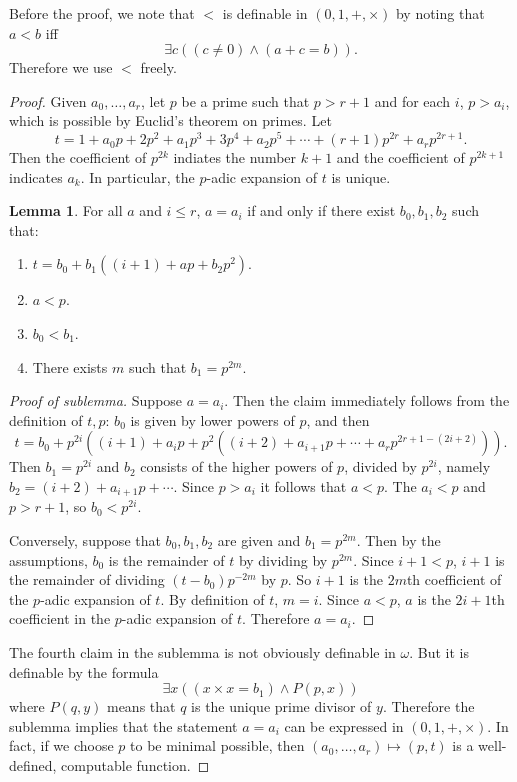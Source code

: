 \documentclass[12pt]{report}
\theoremstyle{definition}
\newtheorem{lemma}[theorem]{Lemma}
\begin{document}
Before the proof, we note that $<$ is definable in $(0, 1, +, \times)$ by noting that $a < b$ iff
$$\exists c((c \neq 0) \wedge (a + c = b)).$$
Therefore we use $<$ freely.
\begin{proof}
Given $a_0, \dots, a_r$, let $p$ be a prime such that $p > r + 1$ and for each $i$, $p > a_i$, which is possible by Euclid's theorem on primes. Let
$$t = 1 + a_0p + 2p^2 + a_1p^3 + 3p^4 + a_2p^5 + \cdots + (r+1)p^{2r} + a_r p^{2r+1}.$$
Then the coefficient of $p^{2k}$ indiates the number $k+1$ and the coefficient of $p^{2k+1}$ indicates $a_k$. In particular, the $p$-adic expansion of $t$ is unique.
\begin{lemma}
For all $a$ and $i \leq r$, $a = a_i$ if and only if there exist $b_0, b_1,b_2$ such that:
\begin{enumerate}
\item $t = b_0 + b_1((i+1) + ap + b_2p^2)$.
\item $a < p$.
\item $b_0 < b_1$.
\item There exists $m$ such that $b_1 = p^{2m}$.
\end{enumerate}
\end{lemma}
\begin{proof}[Proof of sublemma]
Suppose $a = a_i$. Then the claim immediately follows from the definition of $t, p$: $b_0$ is given by lower powers of $p$, and then
$$t = b_0 + p^{2i}((i+1) + a_ip + p^2((i+2) + a_{i+1}p + \cdots + a_rp^{2r+1 - (2i +2)} )).$$
Then $b_1 = p^{2i}$ and $b_2$ consists of the higher powers of $p$, divided by $p^{2i}$, namely $b_2 = (i+2) + a_{i+1}p + \cdots$. Since $p > a_i$ it follows that $a < p$. The $a_i < p$ and $p > r + 1$, so $b_0 < p^{2i}$.

Conversely, suppose that $b_0, b_1, b_2$ are given and $b_1 = p^{2m}$. Then by the assumptions, $b_0$ is the remainder of $t$ by dividing by $p^{2m}$. Since $i + 1 < p$, $i + 1$ is the remainder of dividing $(t - b_0)p^{-2m}$ by $p$. So $i + 1$ is the $2m$th coefficient of the $p$-adic expansion of $t$. By definition of $t$, $m = i$.
Since $a < p$, $a$ is the $2i+1$th coefficient in the $p$-adic expansion of $t$. Therefore $a = a_i$.
\end{proof}
The fourth claim in the sublemma is not obviously definable in $\omega$. But it is definable by the formula
$$\exists x((x \times x = b_1) \wedge P(p, x))$$
where $P(q, y)$ means that $q$ is the unique prime divisor of $y$. Therefore the sublemma implies that the statement $a = a_i$ can be expressed in $(0, 1, +, \times)$.
In fact, if we choose $p$ to be minimal possible, then $(a_0, \dots, a_r) \mapsto (p, t)$ is a well-defined, computable function.


\end{proof}
\end{document}
